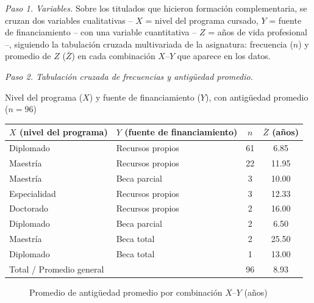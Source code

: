 \textit{Paso 1. Variables.} Sobre los titulados que hicieron formación complementaria, se cruzan dos variables cualitativas -- $X$ = nivel del programa cursado, $Y$ = fuente de financiamiento -- con una variable cuantitativa -- $Z$ = años de vida profesional --, siguiendo la tabulación cruzada multivariada de la asignatura: frecuencia ($n$) y promedio de $Z$ ($\bar{Z}$) en cada combinación $X$--$Y$ que aparece en los datos.

\textit{Paso 2. Tabulación cruzada de frecuencias y antigüedad promedio.}

\begin{mitabla}{Nivel del programa ($X$) y fuente de financiamiento ($Y$), con antigüedad promedio ($n=96$)}
\begin{tabular}{llcc}
\toprule
$X$ (nivel del programa) & $Y$ (fuente de financiamiento) & $n$ & $\bar{Z}$ (años) \\
\midrule
Diplomado & Recursos propios & 61 & 6.85 \\
Maestría & Recursos propios & 22 & 11.95 \\
Maestría & Beca parcial & 3 & 10.00 \\
Especialidad & Recursos propios & 3 & 12.33 \\
Doctorado & Recursos propios & 2 & 16.00 \\
Diplomado & Beca parcial & 2 & 6.50 \\
Maestría & Beca total & 2 & 25.50 \\
Diplomado & Beca total & 1 & 13.00 \\
\midrule
\multicolumn{2}{l}{Total / Promedio general} & 96 & 8.93 \\
\bottomrule
\end{tabular}
\end{mitabla}

\begin{figure}[H]
\centering
\caption{Promedio de antigüedad promedio por combinación $X$--$Y$ (años)}
\end{figure}

